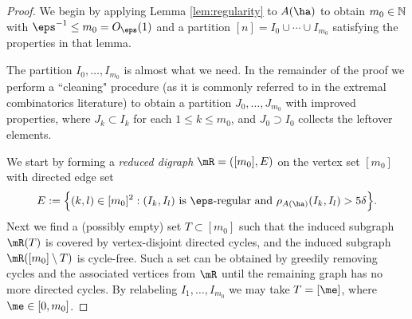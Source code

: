 \documentclass[aop,preprint]{imsart}
\theoremstyle{plain}
\theoremstyle{definition}
\theoremstyle{remark}
\numberwithin{equation}{section}
\numberwithin{theorem}{section}
\begin{document}
\begin{proof}
We begin by applying Lemma \ref{lem:regularity} to $A(\ha)$ to obtain $m_0\in {\mathbb N}$ with $\eps^{-1}\le m_0=O_\eps(1)$ and a partition $[n]=I_0\cup\cdots \cup I_{m_0}$ satisfying the properties in that lemma.

The partition $I_0,\dots,I_{m_0}$ is almost what we need.
In the remainder of the proof we perform a ``cleaning" procedure (as it is commonly referred to in the extremal combinatorics literature) to obtain a partition $J_0,\dots, J_{m_0}$ with improved properties, where $J_k\subset I_k$ for each $1\le k\le m_0$, and $J_0\supset I_0$ collects the leftover elements. 

We start by forming a \emph{reduced digraph} $\mR=([m_0],E)$ on the vertex set $[m_0]$ with directed edge set
\begin{equation}
E:= \Big\{ (k,l)\in [m_0]^2: (I_k,I_l) \mbox{ is $\eps$-regular and } \rho_{A(\ha)}(I_k,I_l) >5\delta\Big\}.
\end{equation}
Next we find a (possibly empty) set $T\subset [m_0]$ such that the induced subgraph $\mR(T)$ is covered by vertex-disjoint directed cycles, and the induced subgraph $\mR([m_0]\setminus T)$ is cycle-free.
Such a set can be obtained by greedily removing cycles and the associated vertices from $\mR$ until the remaining graph has no more directed cycles.
By relabeling $I_1,\dots, I_{m_0}$ we may take $T=[\me]$, where $\me\in [0, m_0]$. 


\end{proof}
\end{document}
